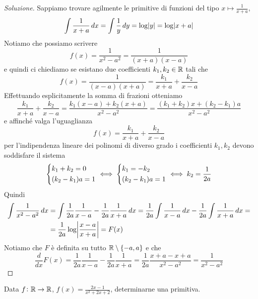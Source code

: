 \begin{proof}[Soluzione]
    Sappiamo trovare agilmente le primitive di funzioni del tipo $x\mapsto \frac{1}{x+a}$, 
    \[
    \int \frac{1}{x+a}\, dx = \int \frac{1}{y}\, dy = \log\abs{y} = \log\abs{x+a}
    \]
    Notiamo che possiamo scrivere
    \[
    f(x) = \frac{1}{x^2-a^2} = \frac{1}{(x+a)(x-a)}
    \]
    e quindi ci chiediamo se esistano due coefficienti $k_1, k_2\in\amsbb{R}$ tali che
    \[
    f(x) = \frac{1}{(x-a)(x+a)} = \frac{k_1}{x+a} + \frac{k_2}{x-a}
    \]
    Effettuando esplicitamente la somma di frazioni otteniamo
    \[
    \frac{k_1}{x+a} + \frac{k_2}{x-a} = \frac{k_1(x-a)+k_2(x+a)}{x^2-a^2} = \frac{(k_1+k_2)x+(k_2-k_1)a}{x^2-a^2}
    \]
    e affinché valga l'uguaglianza
    \[
    f(x) = \frac{k_1}{x+a}+\frac{k_2}{x-a}
    \]
    per l'indipendenza lineare dei polinomi di diverso grado i coefficienti $k_1, k_2$ devono soddisfare il sistema
    \[
    \begin{dcases}
        k_1 +k_2 = 0\\
        (k_2-k_1)a=1
    \end{dcases} \iff \begin{dcases}
        k_1 =- k_2\\
        (k_2-k_1)a=1
    \end{dcases} \iff k_2 = \frac{1}{2a}
    \]
    Quindi
    \[
    \begin{split}
        \int \frac{1}{x^2-a^2}\, dx & = \int \frac{1}{2a}\frac{1}{x-a}-\frac{1}{2a}\frac{1}{x+a}\, dx = \frac{1}{2a}\int \frac{1}{x-a}\, dx - \frac{1}{2a}\int \frac{1}{x+a}\, dx = \\
        & = \frac{1}{2a}\log\abs{\frac{x-a}{x+a}}=F(x)
    \end{split}
    \]
    Notiamo che $F$ è definita su tutto $\amsbb{R}\setminus\{-a,a\}$ e che 
    \[
    \frac{d}{dx}F(x) = \frac{1}{2a} \frac{1}{x-a}-\frac{1}{2a}\frac{1}{x+a} = \frac{1}{2a}\frac{x+a-x+a}{x^2-a^2} = \frac{1}{x^2-a^2}
    \]
\end{proof}
\begin{exercise}
    \label{ex:8.6}
    Data $f\colon \amsbb{R}\to\amsbb{R}$, $f(x)=\frac{2x-1}{x^2+2x+2}$, determinarne una primitiva.
\end{exercise}
